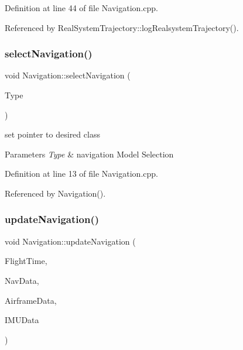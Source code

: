 Definition at line 44 of file Navigation.\+cpp.



Referenced by Real\+System\+Trajectory\+::log\+Realsystem\+Trajectory().

\mbox{\label{class_navigation_a28fa35df18463041f124bfca64192b1d}} 
\subsubsection{\texorpdfstring{select\+Navigation()}{selectNavigation()}}
{\footnotesize\ttfamily void Navigation\+::select\+Navigation (\begin{DoxyParamCaption}\item[{int}]{Type }\end{DoxyParamCaption})}



set pointer to desired class 


\begin{DoxyParams}{Parameters}
{\em Type} & navigation Model Selection \\
\hline
\end{DoxyParams}


Definition at line 13 of file Navigation.\+cpp.



Referenced by Navigation().

\mbox{\label{class_navigation_a0207da055af9d6c0262a4cbd9e39ce19}} 
\subsubsection{\texorpdfstring{update\+Navigation()}{updateNavigation()}}
{\footnotesize\ttfamily void Navigation\+::update\+Navigation (\begin{DoxyParamCaption}\item[{\hyperlink{group___tools_ga3f1431cb9f76da10f59246d1d743dc2c}{Float64}}]{Flight\+Time,  }\item[{Navigation\+Struct \&}]{Nav\+Data,  }\item[{Airframe\+Struct \&}]{Airframe\+Data,  }\item[{I\+M\+U\+Struct \&}]{I\+M\+U\+Data }\end{DoxyParamCaption})}



